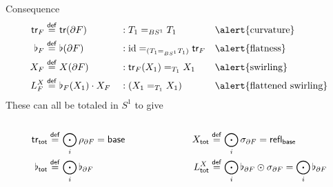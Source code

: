 \begin{frame}{Consequence}
\[\begin{aligned}
\tr_F&\defeq \tr(\partial F)&&:T_1=_{BS^1}T_1&&\text{\alert{curvature}}\\
\flat_F&\defeq \flat(\partial F)&&:\id=_{(T_1=_{BS^1}T_1)}\tr_F&&\text{\alert{flatness}}\\
X_F&\defeq X(\partial F)&&:\tr_F(X_1)=_{T_1}X_1&&\text{\alert{swirling}}\\
L^X_F&\defeq\flat_F(X_1)\cdot X_F&&:(X_1=_{T_1}X_1)&&\text{\alert{flattened swirling}}
\end{aligned}\]
These can all be totaled in \( S^1 \) to give
\begin{columns}[t]
\begin{column}{0.5\textwidth}
\[\begin{aligned}
\mathsf{tr}_{\mathsf{tot}}&\stackrel{\mathsf{def}}{=} \bigodot_i \rho_{\partial F} = \mathsf{base}\\
\flat_{\mathsf{tot}}&\stackrel{\mathsf{def}}{=} \bigodot_i\flat_{\partial F}\\
\end{aligned}\]
\end{column}
\begin{column}{0.5\textwidth}
\[\begin{aligned}
X_{\mathsf{tot}}&\stackrel{\mathsf{def}}{=} \bigodot_i \sigma_{\partial F} = \mathsf{refl}_{\mathsf{base}}\\
L^X_{\mathsf{tot}}&\stackrel{\mathsf{def}}{=} \bigodot_i \flat_{\partial F} \odot \sigma_{\partial F} = \bigodot_i \flat_{\partial F}
\end{aligned}\]
\end{column}
\end{columns}
\end{frame}

